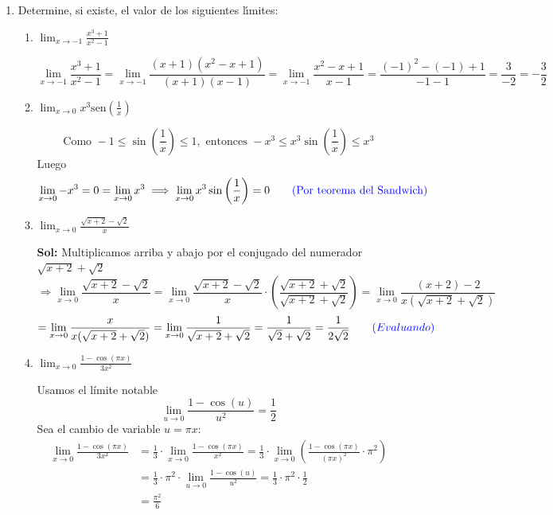 \documentclass[letterpaper,12pt]{article}
\theoremstyle{plain}
\theoremstyle{definition}
\newcommand{\sen}{\text{sen}}
\begin{document}
\begin{enumerate}
\item \noindent Determine, si existe, el valor de los siguientes l\'{\i}mites:
\begin{enumerate}
\item $\displaystyle \lim_{x \to -1} \frac{x^3 + 1}{x^2 - 1}$

\vspace{0.2cm}
\color{blue}
\[
\lim_{x \to -1} \frac{x^3 + 1}{x^2 - 1}
= \lim_{x \to -1} \frac{(x + 1)(x^2 - x + 1)}{(x + 1)(x - 1)}
= \lim_{x \to -1} \frac{x^2 - x + 1}{x - 1}
= \frac{(-1)^2 - (-1) + 1}{-1 - 1} = \frac{3}{-2} = -\frac{3}{2}
\]
\color{black}

\item $\displaystyle \lim_{x \to 0} x^3 \sen\left(\frac{1}{x}\right)$   

\vspace{0.2cm}
\color{blue}
\[
\text{Como } -1 \leq \sin\left(\frac{1}{x}\right) \leq 1, \text{ entonces } -x^3 \leq x^3 \sin\left(\frac{1}{x}\right) \leq x^3 
\]
Luego
\[
\lim_{x \to 0} -x^3 = 0 = \lim_{x \to 0} x^3 \implies
\lim_{x \to 0} x^3 \sin\left(\frac{1}{x}\right) = 0 \quad\quad \textcolor{blue}{\text{(Por teorema del Sandwich)}}
\]
\color{black}

\item $\displaystyle \lim_{x \to 0} \frac{\sqrt{x+2} - \sqrt{2}}{x}$

\vspace{0.2cm}
\color{blue}
\textbf{Sol:} Multiplicamos arriba y abajo por el conjugado del numerador $\sqrt{x+2} + \sqrt{2}$
\[
\Rightarrow \lim_{x \to 0} \frac{\sqrt{x+2} - \sqrt{2}}{x}
= \lim_{x \to 0} \frac{\sqrt{x+2} - \sqrt{2}}{x}  \cdot \left( \frac{\sqrt{x+2} + \sqrt{2}}{\sqrt{x+2} + \sqrt{2}} \right)
= \lim_{x \to 0} \frac{(x+2) - 2}{x(\sqrt{x+2} + \sqrt{2})}
\]
\[= \lim_{x \to 0} \frac{x}{x(\sqrt{x+2} + \sqrt{2})}
= \lim_{x \to 0} \frac{1}{\sqrt{x+2} + \sqrt{2}} = \frac{1}{\sqrt{2} + \sqrt{2}} = \frac{1}{2\sqrt{2}} \quad \quad \textcolor{blue}{(Evaluando)}
\]
\color{black}
\item $\displaystyle \lim_{x \to 0} \frac{1 - \cos(\pi x)}{3x^2} $

\vspace{0.2cm}
\color{blue}
 Usamos el límite notable
\[
\lim_{u \to 0} \frac{1 - \cos(u)}{u^2} = \frac{1}{2}
\]
Sea el cambio de variable \( u = \pi x \):
\begin{align*}
\lim_{x \to 0} \frac{1 - \cos(\pi x)}{3x^2}
&= \frac{1}{3} \cdot \lim_{x \to 0} \frac{1 - \cos(\pi x)}{x^2} = \frac{1}{3} \cdot \lim_{x \to 0} \left( \frac{1 - \cos(\pi x)}{(\pi x)^2} \cdot \pi^2 \right) \\
&= \frac{1}{3} \cdot \pi^2 \cdot \lim_{u \to 0} \frac{1 - \cos(u)}{u^2} = \frac{1}{3} \cdot \pi^2 \cdot \frac{1}{2} \\
&= \frac{\pi^2}{6}
\end{align*}
\color{black}
\end{enumerate}


\end{enumerate}
\end{document}
